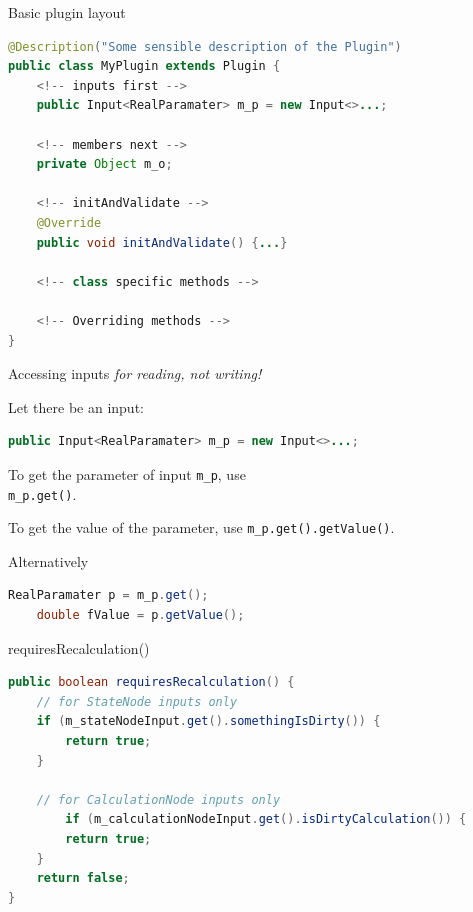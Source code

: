 \documentclass{beamer}
\theoremstyle{definition}
\begin{document}
\begin{frame}[containsverbatim]{Basic plugin layout}

\begin{lstlisting}[language=java]
@Description("Some sensible description of the Plugin")
public class MyPlugin extends Plugin {
    <!-- inputs first -->
    public Input<RealParamater> m_p = new Input<>...;

    <!-- members next -->
    private Object m_o;

    <!-- initAndValidate -->
    @Override
    public void initAndValidate() {...}

    <!-- class specific methods -->

    <!-- Overriding methods -->
}
\end{lstlisting}

\end{frame}


\begin{frame}[containsverbatim]{Accessing inputs {\em for reading, not writing!}}

Let there be an input:

\begin{lstlisting}[language=java]
public Input<RealParamater> m_p = new Input<>...;
\end{lstlisting}\vskip0.5cm

To get the parameter of input {\tt m\_p}, use\\ {\tt m\_p.get()}.\vskip0.5cm

To get the value of the parameter, use {\tt m\_p.get().getValue()}.\vskip0.5cm

Alternatively 

\begin{lstlisting}[language=java]
    RealParamater p = m_p.get();
    double fValue = p.getValue();
\end{lstlisting}

\end{frame}

\begin{frame}[containsverbatim]{requiresRecalculation()}

\begin{lstlisting}[language=java]
public boolean requiresRecalculation() {
	// for StateNode inputs only
	if (m_stateNodeInput.get().somethingIsDirty()) {
		return true;
	}

	// for CalculationNode inputs only
        if (m_calculationNodeInput.get().isDirtyCalculation()) {
		return true;
	}
	return false;
}
\end{lstlisting}

\end{frame}
\end{document}
